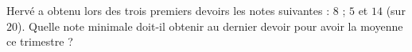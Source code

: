 
\begin{exercice}\label{exo2smath-0290}


Hervé a obtenu lors des trois premiers devoirs les notes suivantes : $8$ ; $5$ et $14$ (sur \( 20\)).  Quelle note minimale doit-il obtenir au dernier devoir pour avoir la moyenne ce trimestre ?

\end{exercice}

